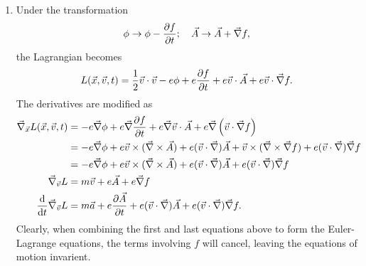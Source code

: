 \documentclass[12pt]{article}
\newcommand{\vecnabla}{\vec{\nabla}}
\begin{document}
\begin{enumerate}[label=\roman*.]
    \item Under the transformation
    \[ \phi \to \phi - \pdv{f}{t}; \quad \vec{A} \to \vec{A} + \vecnabla f, \]
    the Lagrangian becomes
    \[ L(\vec{x}, \vec{v}, t) = \frac{1}{2}\vec{v}\cdot\vec{v} - e\phi + e\pdv{f}{t} + e\vec{v}\cdot{\vec{A}} + e\vec{v}\cdot\vecnabla f. \]
    The derivatives are modified as
    \begin{align*}
        \vecnabla_{\vec{x}}L(\vec{x}, \vec{v}, t) &= -e\vecnabla\phi + e\vecnabla\pdv{f}{t} + e\vecnabla\vec{v}\cdot\vec{A} + e\vecnabla\left(\vec{v}\cdot\vecnabla f\right) \\
        &= -e\vecnabla\phi + e \vec{v}\times(\vecnabla\times\vec{A}) + e(\vec{v}\cdot\vecnabla)\vec{A} + \vec{v}\times(\vecnabla\times\vecnabla f) + e(\vec{v}\cdot\vecnabla)\vecnabla f \\
        &= -e\vecnabla\phi + e \vec{v}\times(\vecnabla\times\vec{A}) + e(\vec{v}\cdot\vecnabla)\vec{A} + e(\vec{v}\cdot\vecnabla)\vecnabla f \\
        \vecnabla_{\vec{v}}L &= m\vec{v} + e\vec{A} + e\vecnabla f \\
        \dv{t}\vecnabla_{\vec{v}}L &= m\vec{a} + e\pdv{\vec{A}}{t} + e(\vec{v}\cdot\vecnabla)\vec{A} + e(\vec{v}\cdot\vecnabla)\vecnabla f.
    \end{align*}
    Clearly, when combining the first and last equations above to form the Euler-Lagrange equations, the terms involving $f$ will cancel, leaving the equations of motion invarient.
\end{enumerate}
\end{document}
